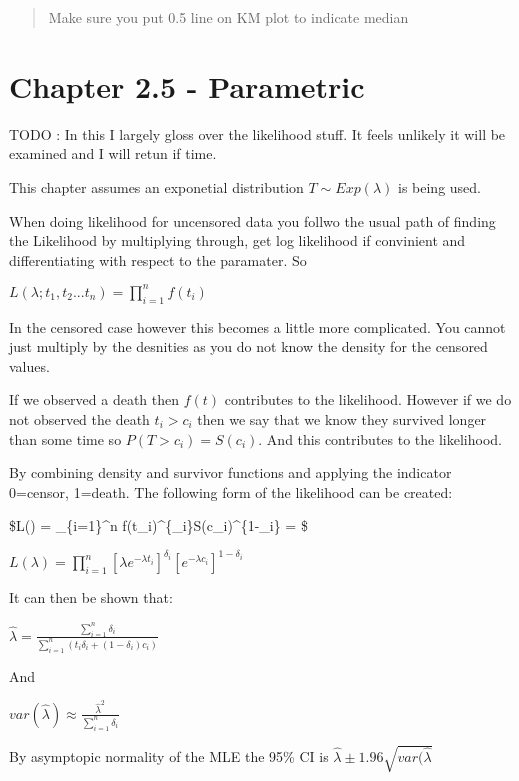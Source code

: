\documentclass[
  letterpaper,
  DIV=11,
  numbers=noendperiod]{scrreprt}
\begin{document}
\begin{quote}
Make sure you put 0.5 line on KM plot to indicate median
\end{quote}

\hypertarget{chapter-2.5---parametric}{%
\section{Chapter 2.5 - Parametric}\label{chapter-2.5---parametric}}

TODO : In this I largely gloss over the likelihood stuff. It feels
unlikely it will be examined and I will retun if time.

This chapter assumes an exponetial distribution \(T \sim Exp(\lambda)\)
is being used.

When doing likelihood for uncensored data you follwo the usual path of
finding the Likelihood by multiplying through, get log likelihood if
convinient and differentiating with respect to the paramater. So

\(L(\lambda ; t_1, t_2 ... t_n) = \prod^n_{i=1}f(t_i)\)

In the censored case however this becomes a little more complicated. You
cannot just multiply by the desnities as you do not know the density for
the censored values.

If we observed a death then \(f(t)\) contributes to the likelihood.
However if we do not observed the death \(t_i > c_i\) then we say that
we know they survived longer than some time so \(P(T > c_i) = S(c_i)\).
And this contributes to the likelihood.

By combining density and survivor functions and applying the indicator
0=censor, 1=death. The following form of the likelihood can be created:

\$L(\lambda) = \prod\_\{i=1\}\^{}n
f(t\_i)\^{}\{\delta\_i\}S(c\_i)\^{}\{1-\delta\_i\} = \$

\(L(\lambda) = \prod_{i=1}^n [\lambda e^{-\lambda t_i}]^{\delta_i}[e^{-\lambda c_i}]^{1-\delta_i}\)

It can then be shown that:

\(\hat{\lambda} = \frac{\sum^n_{i=1} \delta_i}{\sum^n_{i=1}(t_i\delta_i +(1-\delta_i)c_i)}\)

And

\(var(\hat{\lambda}) \approx \frac{\hat{\lambda}^2}{\sum^n_{i=1} \delta_i}\)

By asymptopic normality of the MLE the 95\% CI is
\(\hat{\lambda}\pm 1.96\sqrt{var(\hat{\lambda}}\)
\end{document}
